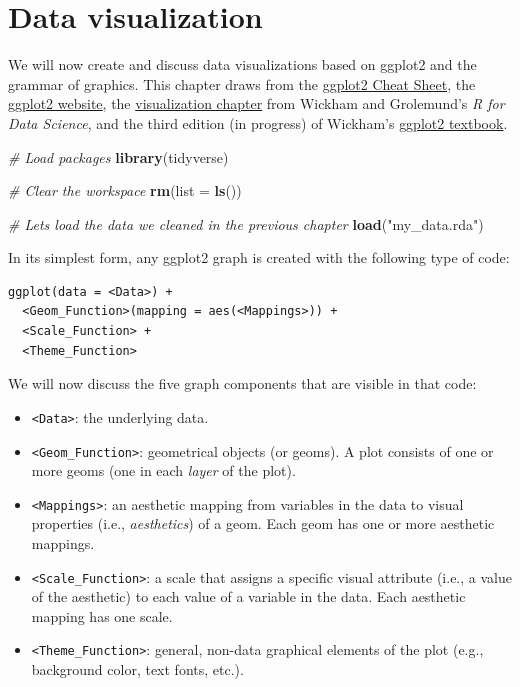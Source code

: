 \documentclass[
]{book}
\newenvironment{Shaded}{\begin{snugshade}}{\end{snugshade}}
\newcommand{\AttributeTok}[1]{\textcolor[rgb]{0.13,0.29,0.53}{#1}}
\newcommand{\CommentTok}[1]{\textcolor[rgb]{0.56,0.35,0.01}{\textit{#1}}}
\newcommand{\FunctionTok}[1]{\textcolor[rgb]{0.13,0.29,0.53}{\textbf{#1}}}
\newcommand{\NormalTok}[1]{#1}
\newcommand{\StringTok}[1]{\textcolor[rgb]{0.31,0.60,0.02}{#1}}
\providecommand{\tightlist}{%
  \setlength{\itemsep}{0pt}\setlength{\parskip}{0pt}}
\begin{document}
\hypertarget{visualization}{%
\chapter{Data visualization}\label{visualization}}

We will now create and discuss data visualizations based on ggplot2 and the grammar of graphics. This chapter draws from the \href{https://rstudio.github.io/cheatsheets/html/data-visualization.html?_gl=1*10368jz*_ga*MjQ1OTc2NzA0LjE3MTIxMzM1NTU.*_ga_2C0WZ1JHG0*MTcxMzUyMzU4My40LjEuMTcxMzUyMzYxNS4wLjAuMA..}{ggplot2 Cheat Sheet}, the \href{https://ggplot2.tidyverse.org/}{ggplot2 website}, the \href{https://r4ds.hadley.nz/data-visualize.html}{visualization chapter} from Wickham and Grolemund's \emph{R for Data Science}, and the third edition (in progress) of Wickham's \href{https://ggplot2-book.org/}{ggplot2 textbook}.

\begin{Shaded}
\begin{Highlighting}[]
\CommentTok{\# Load packages}
\FunctionTok{library}\NormalTok{(tidyverse)}

\CommentTok{\# Clear the workspace}
\FunctionTok{rm}\NormalTok{(}\AttributeTok{list =} \FunctionTok{ls}\NormalTok{())}

\CommentTok{\# Let\textquotesingle{}s load the data we cleaned in the previous chapter}
\FunctionTok{load}\NormalTok{(}\StringTok{"my\_data.rda"}\NormalTok{)}
\end{Highlighting}
\end{Shaded}

In its simplest form, any ggplot2 graph is created with the following type of code:

\begin{verbatim}
ggplot(data = <Data>) +
  <Geom_Function>(mapping = aes(<Mappings>)) +
  <Scale_Function> +
  <Theme_Function>
\end{verbatim}

We will now discuss the five graph components that are visible in that code:

\begin{itemize}
\tightlist
\item
  \texttt{\textless{}Data\textgreater{}}: the underlying data.
\item
  \texttt{\textless{}Geom\_Function\textgreater{}}: geometrical objects (or geoms). A plot consists of one or more geoms (one in each \emph{layer} of the plot).
\item
  \texttt{\textless{}Mappings\textgreater{}}: an aesthetic mapping from variables in the data to visual properties (i.e., \emph{aesthetics}) of a geom. Each geom has one or more aesthetic mappings.
\item
  \texttt{\textless{}Scale\_Function\textgreater{}}: a scale that assigns a specific visual attribute (i.e., a value of the aesthetic) to each value of a variable in the data. Each aesthetic mapping has one scale.
\item
  \texttt{\textless{}Theme\_Function\textgreater{}}: general, non-data graphical elements of the plot (e.g., background color, text fonts, etc.).
\end{itemize}
\end{document}
